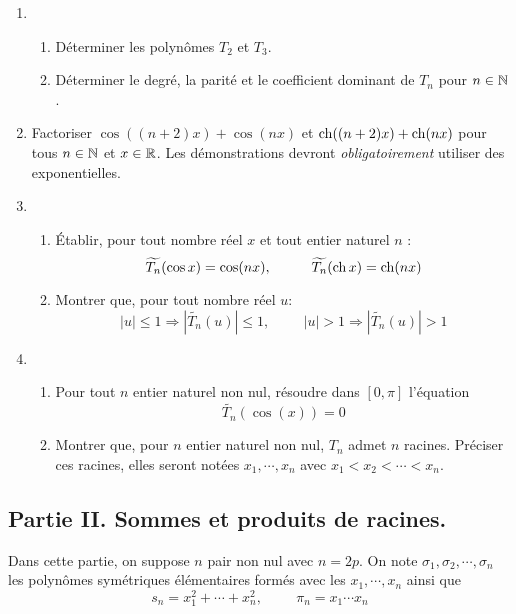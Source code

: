 \begin{enumerate}
\item \begin{enumerate}
 \item Déterminer les polynômes $T_2$ et $T_3$.
\item Déterminer le degré, la parité et le coefficient dominant de $T_n$ pour $n\in\mathbb{N}$.
\end{enumerate}
\item Factoriser $\cos((n+2)x)+\cos (nx)$ et $\operatorname{ch}((n+2)x)+\operatorname{ch} (nx)$ pour tous $n\in\mathbb{N}$ et $x\in \mathbb{R}$. Les démonstrations devront \emph{obligatoirement} utiliser des exponentielles.
\item
\begin{enumerate}
  \item \'Etablir, pour tout nombre réel $x$ et tout entier naturel $n$ :
\begin{displaymath}
 \widetilde{T_n}(\cos x)=\cos(nx), \hspace{1cm} \widetilde{T_n}(\operatorname{ch} x)=\operatorname{ch}(nx)
\end{displaymath}
  \item Montrer que, pour tout nombre réel $u$:
\begin{displaymath}
 |u|\leq 1 \Rightarrow \left\vert \widetilde{T_n}(u)\right\vert \leq 1, \hspace{1cm}
 |u|> 1 \Rightarrow \left\vert \widetilde{T_n}(u)\right\vert > 1
\end{displaymath}
\end{enumerate}
\item \begin{enumerate}
        \item Pour tout $n$ entier naturel non nul, résoudre dans $[0,\pi]$ l'équation
\begin{displaymath}
  \widetilde{T_n}(\cos(x))=0
\end{displaymath}
 \item Montrer que, pour $n$ entier naturel non nul, $T_n$ admet $n$ racines. Préciser ces racines, elles seront notées $x_1,\cdots , x_{n}$ avec $x_1<x_2<\cdots<x_{n}$.
\end{enumerate}
\end{enumerate}


\subsection*{Partie II. Sommes et produits de racines.}
Dans cette partie, on suppose $n$ pair non nul avec $n=2p$. 
On note $\sigma_1, \sigma_2 , \cdots ,\sigma_n$ les polynômes symétriques élémentaires formés avec les $x_1, \cdots, x_n$ ainsi que
\begin{displaymath}
 s_n=x_1^2+\cdots+x_n^2, \hspace{1cm} \pi_n = x_1 \cdots x_n
\end{displaymath}

